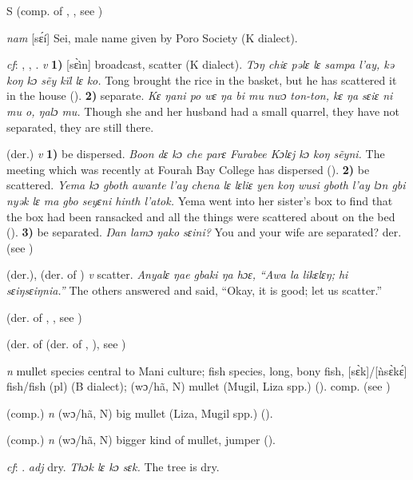 \begin{letter}{S}
 (comp. of , , see ) 

 \textit{nam} [sɛ́í] Sei, male name given by Poro Society (K dialect). 

 \textit{cf}: , , . \textit{v} \textbf{1)} [sɛ̀ìn] broadcast, scatter (K dialect). \textit{Tɔŋ chiɛ pəlɛ lɛ sampa l'ay, kə koŋ kɔ sẽy kïl lɛ ko.} Tong brought the rice in the basket, but he has scattered it in the house (\citealt{Pichl1967}). \textbf{2)} separate. \textit{Kɛ ŋani po wɛ ŋa bi mu nwɔ ton-ton, kɛ ŋa sɛiɛ ni mu o, ŋalɔ mu.} Though she and her husband had a small quarrel, they have not separated, they are still there.

 (der.) \textit{v} \textbf{1)} be dispersed. \textit{Boon dɛ kɔ che parɛ Furabee Kɔlɛj kɔ koŋ sẽyni.} The meeting which was recently at Fourah Bay College has dispersed (\citealt{Pichl1967}). \textbf{2)} be scattered. \textit{Yema kɔ gboth awante l'ay chena lɛ lɛliɛ yen koŋ wusi gboth l'ay lɔn gbi nyək lɛ ma gbo seyɛni hinth l'atok.} Yema went into her sister's box to find that the box had been ransacked and all the things were scattered about on the bed (\citealt{Pichl1967}). \textbf{3)} be separated. \textit{Ŋan lamɔ ŋako sɛini?} You and your wife are separated? der.  (see )

 (der.), (der. of ) \textit{v} scatter. \textit{Anyalɛ ŋae gbaki ŋa hɔɛ, “Awa la likɛlɛŋ; hi sɛiŋsɛiŋnia.”} The others answered and said, “Okay, it is good; let us scatter.”

 (der. of , , see )

 (der. of  (der. of , ), see ) 

 \textit{n} mullet species central to Mani culture; fish species, long, bony fish, [sɛ̀k]/[ǹsɛ̀kɛ́] fish/fish (pl) (B dialect); (wɔ/hã, N) mullet (Mugil, Liza spp.) (\citealt{Pichl1967}). comp.  (see ) 

 (comp.) \textit{n} (wɔ/hã, N) big mullet (Liza, Mugil spp.) (\citealt{Pichl1967}). 

 (comp.) \textit{n} (wɔ/hã, N) bigger kind of mullet, jumper (\citealt{Pichl1967}). 

 \textit{cf}: . \textit{adj} dry. \textit{Thɔk lɛ kɔ sɛk.} The tree is dry.


\end{letter}
